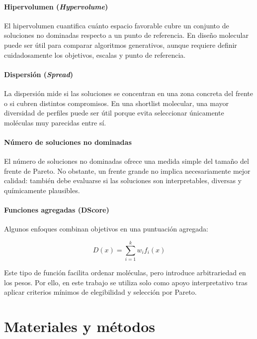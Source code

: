 \documentclass[IB]{TFUOC}%
\begin{document}
\subsubsection{Hipervolumen (\textit{Hypervolume})}

El hipervolumen cuantifica cuánto espacio favorable cubre un conjunto de soluciones no dominadas respecto a un punto de referencia. En diseño molecular puede ser útil para comparar algoritmos generativos, aunque requiere definir cuidadosamente los objetivos, escalas y punto de referencia.

\subsubsection{Dispersión (\textit{Spread})}

La dispersión mide si las soluciones se concentran en una zona concreta del frente o si cubren distintos compromisos. En una shortlist molecular, una mayor diversidad de perfiles puede ser útil porque evita seleccionar únicamente moléculas muy parecidas entre sí.

\subsubsection{Número de soluciones no dominadas}

El número de soluciones no dominadas ofrece una medida simple del tamaño del frente de Pareto. No obstante, un frente grande no implica necesariamente mejor calidad: también debe evaluarse si las soluciones son interpretables, diversas y químicamente plausibles.

\subsubsection{Funciones agregadas (DScore)}

Algunos enfoques combinan objetivos en una puntuación agregada:

\begin{equation}
D(x) = \sum_{i=1}^{k} w_i f_i(x)
\end{equation}

Este tipo de función facilita ordenar moléculas, pero introduce arbitrariedad en los pesos. Por ello, en este trabajo se utiliza solo como apoyo interpretativo tras aplicar criterios mínimos de elegibilidad y selección por Pareto.




\chapter{Materiales y métodos}
\end{document}
